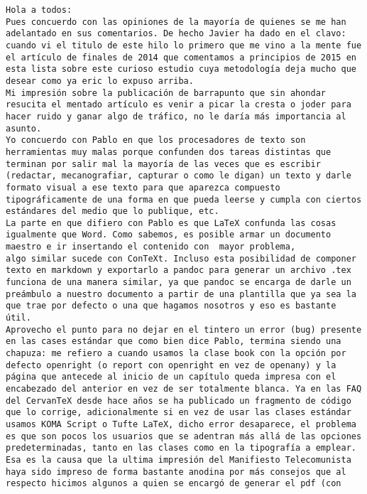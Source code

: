 \documentclass[a4paper,10pt]{article}
\begin{document}
\begin{lstlisting}
Hola a todos:
Pues concuerdo con las opiniones de la mayoría de quienes se me han
adelantado en sus comentarios. De hecho Javier ha dado en el clavo:
cuando vi el titulo de este hilo lo primero que me vino a la mente fue
el artículo de finales de 2014 que comentamos a principios de 2015 en
esta lista sobre este curioso estudio cuya metodología deja mucho que
desear como ya eric lo expuso arriba.
Mi impresión sobre la publicación de barrapunto que sin ahondar
resucita el mentado artículo es venir a picar la cresta o joder para
hacer ruido y ganar algo de tráfico, no le daría más importancia al
asunto.
Yo concuerdo con Pablo en que los procesadores de texto son
herramientas muy malas porque confunden dos tareas distintas que
terminan por salir mal la mayoría de las veces que es escribir
(redactar, mecanografiar, capturar o como le digan) un texto y darle
formato visual a ese texto para que aparezca compuesto
tipográficamente de una forma en que pueda leerse y cumpla con ciertos
estándares del medio que lo publique, etc.
La parte en que difiero con Pablo es que LaTeX confunda las cosas
igualmente que Word. Como sabemos, es posible armar un documento
maestro e ir insertando el contenido con  mayor problema,
algo similar sucede con ConTeXt. Incluso esta posibilidad de componer
texto en markdown y exportarlo a pandoc para generar un archivo .tex
funciona de una manera similar, ya que pandoc se encarga de darle un
preámbulo a nuestro documento a partir de una plantilla que ya sea la
que trae por defecto o una que hagamos nosotros y eso es bastante
útil.
Aprovecho el punto para no dejar en el tintero un error (bug) presente
en las cases estándar que como bien dice Pablo, termina siendo una
chapuza: me refiero a cuando usamos la clase book con la opción por
defecto openright (o report con openright en vez de openany) y la
página que antecede al inicio de un capítulo queda impresa con el
encabezado del anterior en vez de ser totalmente blanca. Ya en las FAQ
del CervanTeX desde hace años se ha publicado un fragmento de código
que lo corrige, adicionalmente si en vez de usar las clases estándar
usamos KOMA Script o Tufte LaTeX, dicho error desaparece, el problema
es que son pocos los usuarios que se adentran más allá de las opciones
predeterminadas, tanto en las clases como en la tipografía a emplear.
Esa es la causa que la ultima impresión del Manifiesto Telecomunista
haya sido impreso de forma bastante anodina por más consejos que al
respecto hicimos algunos a quien se encargó de generar el pdf (con

\end{lstlisting}
\end{document}
